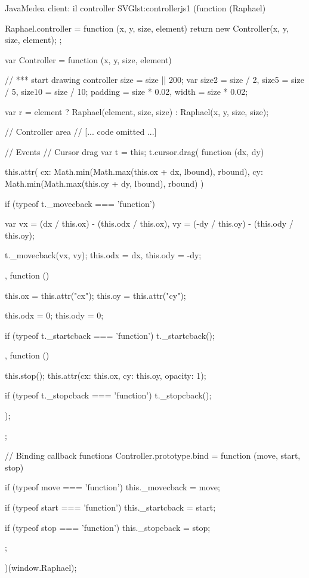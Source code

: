 \begin{mylisting}{Java}{Medea client: il controller SVG}{lst:controllerjs1}
(function (Raphael) {
    Raphael.controller = function (x, y, size, element) {
        return new Controller(x, y, size, element);
    };
    
    var Controller = function (x, y, size, element) {
        // *** start drawing controller
        size = size || 200;
        var size2 = size / 2,
            size5 = size / 5,
            size10 = size / 10;
            padding = size * 0.02,
            width = size * 0.02;
        
        var r = element ? Raphael(element, size, size) : Raphael(x, y, size, size);
        
        // Controller area
        // [... code omitted ...]
        
        // Events
        // Cursor drag
        var t = this; 
        t.cursor.drag(
            function (dx, dy) {
                this.attr({
                    cx: Math.min(Math.max(this.ox + dx, lbound), rbound),
                    cy: Math.min(Math.max(this.oy + dy, lbound), rbound)
                })
                
                if (typeof t._movecback === 'function') {
                    var vx = (dx / this.ox) - (this.odx / this.ox),
                        vy = (-dy / this.oy) - (this.ody / this.oy);
                     
                    t._movecback(vx, vy);
                    this.odx = dx, this.ody = -dy;
                }
            },
            function () {
                this.ox = this.attr("cx");
                this.oy = this.attr("cy");
                
                this.odx = 0;
                this.ody = 0;
                
                if (typeof t._startcback === 'function') t._startcback();
            },
            function () {
                this.stop();
                this.attr({cx: this.ox, cy: this.oy, opacity: 1});
                
                if (typeof t._stopcback === 'function') t._stopcback();
            }
        );
    };
    
    // Binding callback functions
    Controller.prototype.bind = function (move, start, stop) {
        if (typeof move === 'function') this._movecback = move;
            
        if (typeof start === 'function') this._startcback = start;
           
        if (typeof stop === 'function') this._stopcback = stop;
    };
})(window.Raphael);
\end{mylisting}


